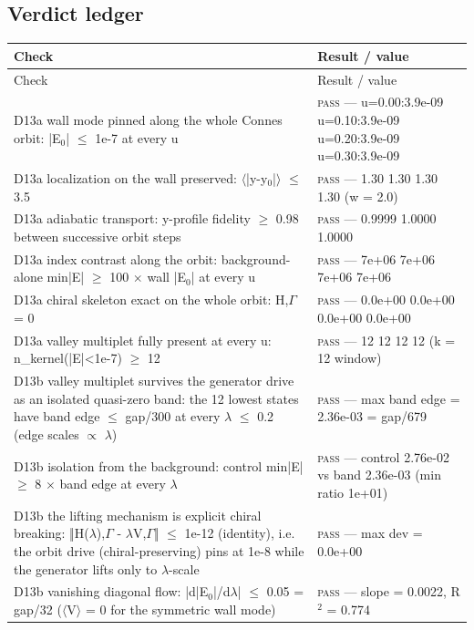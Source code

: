\documentclass[11pt,a4paper]{article}
\begin{document}
\subsection{Verdict ledger}
\begin{longtable}{@{}p{}p{}@{}}
\toprule
Check & Result / value \\
\midrule
\endfirsthead
\toprule
Check & Result / value \\
\midrule
\endhead
\bottomrule
\endfoot
D13a wall mode pinned along the whole Connes orbit: |E$_{0}$| $\le$ 1e-7 at every u & \textsc{pass} --- u=0.00:3.9e-09  u=0.10:3.9e-09  u=0.20:3.9e-09  u=0.30:3.9e-09 \\
D13a localization on the wall preserved: $\langle$|y-y$_{0}$|$\rangle$ $\le$ 3.5 & \textsc{pass} --- 1.30  1.30  1.30  1.30 (w = 2.0) \\
D13a adiabatic transport: y-profile fidelity $\ge$ 0.98 between successive orbit steps & \textsc{pass} --- 0.9999  1.0000  1.0000 \\
D13a index contrast along the orbit: background-alone min|E| $\ge$ 100 $\times$ wall |E$_{0}$| at every u & \textsc{pass} --- 7e+06  7e+06  7e+06  7e+06 \\
D13a chiral skeleton exact on the whole orbit: {H,$\Gamma$} = 0 & \textsc{pass} --- 0.0e+00  0.0e+00  0.0e+00  0.0e+00 \\
D13a valley multiplet fully present at every u: n\_kernel(|E|<1e-7) $\ge$ 12 & \textsc{pass} --- 12  12  12  12 (k = 12 window) \\
D13b valley multiplet survives the generator drive as an isolated quasi-zero band: the 12 lowest states have band edge $\le$ gap/300 at every $\lambda$ $\le$ 0.2 (edge scales $\propto$ $\lambda$) & \textsc{pass} --- max band edge = 2.36e-03 = gap/679 \\
D13b isolation from the background: control min|E| $\ge$ 8 $\times$ band edge at every $\lambda$ & \textsc{pass} --- control 2.76e-02 vs band 2.36e-03 (min ratio 1e+01) \\
D13b the lifting mechanism is explicit chiral breaking: ‖{H($\lambda$),$\Gamma$} - $\lambda${V,$\Gamma$}‖ $\le$ 1e-12 (identity), i.e. the orbit drive (chiral-preserving) pins at 1e-8 while the generator lifts only to $\lambda$-scale & \textsc{pass} --- max dev = 0.0e+00 \\
D13b vanishing diagonal flow: |d|E$_{0}$|/d$\lambda$| $\le$ 0.05 = gap/32 ($\langle$V$\rangle$ = 0 for the symmetric wall mode) & \textsc{pass} --- slope = 0.0022, R$^{2}$ = 0.774 \\
\end{longtable}
\end{document}
